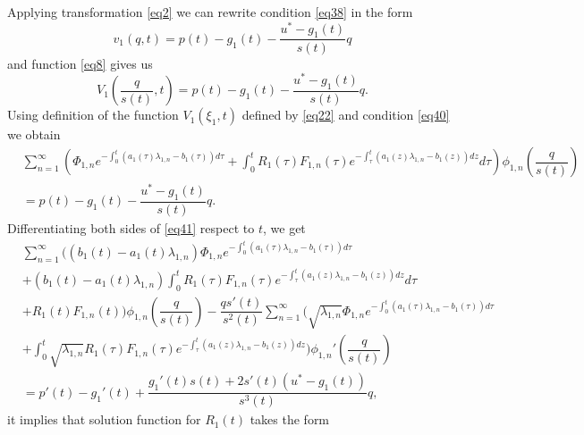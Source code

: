 \documentclass[preprint,12pt,authoryear]{elsarticle}
\begin{document}
Applying transformation \eqref{eq2} we can rewrite condition \eqref{eq38} in the form
\begin{equation}\label{eq39}
    v_1(q,t)=p(t)-g_1(t)-\dfrac{u^*-g_1(t)}{s(t)}q 
\end{equation}
and function \eqref{eq8} gives us 
\begin{equation}\label{eq40}
    V_1\left(\dfrac{q}{s(t)},t\right)=p(t)-g_1(t)-\dfrac{u^*-g_1(t)}{s(t)}q.
\end{equation}
Using definition of the function $V_1(\xi_1,t)$ defined by \eqref{eq22} and condition \eqref{eq40} we obtain
\begin{equation}\label{eq41}
    \begin{split}
        &\sum\limits_{n=1}^{\infty}\left(\Phi_{1,n}e^{-\int_0^t(a_1(\tau)\lambda_{1,n}-b_1(\tau))d\tau}+\int_0^tR_1(\tau)F_{1,n}(\tau)e^{-\int_{\tau}^t(a_1(z)\lambda_{1,n}-b_1(z))dz}d\tau\right)\phi_{1,n}\left(\dfrac{q}{s(t)}\right)\\&=p(t)-g_1(t)-\dfrac{u^*-g_1(t)}{s(t)}q.
    \end{split}
\end{equation}
Differentiating both sides of \eqref{eq41} respect to $t$, we get
\begin{equation}\label{eq42}
    \begin{split}
        &\sum\limits_{n=1}^{\infty}\Bigg((b_1(t)-a_1(t)\lambda_{1,n})\Phi_{1,n}e^{-\int_0^t(a_1(\tau)\lambda_{1,n}-b_1(\tau))d\tau}\\
        &+(b_1(t)-a_1(t)\lambda_{1,n})\int_0^t R_1(\tau)F_{1,n}(\tau)e^{-\int_{\tau}^t(a_1(z)\lambda_{1,n}-b_1(z))dz}d\tau\\&+R_1(t)F_{1,n}(t)\Bigg)\phi_{1,n}\left(\dfrac{q}{s(t)}\right)-\dfrac{qs'(t)}{s^2(t)}\sum\limits_{n=1}^{\infty}\Bigg(\sqrt{\lambda_{1,n}}\Phi_{1,n}e^{-\int_0^t(a_1(\tau)\lambda_{1,n}-b_1(\tau))d\tau}\\&+\int_0^t\sqrt{\lambda_{1,n}}R_1(\tau)F_{1,n}(\tau)e^{-\int_{\tau}^t(a_1(z)\lambda_{1,n}-b_1(z))dz}\Bigg)\phi_{1,n}'\left(\dfrac{q}{s(t)}\right)\\&=p'(t)-g_1'(t)+\dfrac{g_1'(t)s(t)+2s'(t)(u^*-g_1(t))}{s^3(t)}q,
    \end{split}
\end{equation}
it implies that solution function for $R_1(t)$ takes the form
\end{document}
